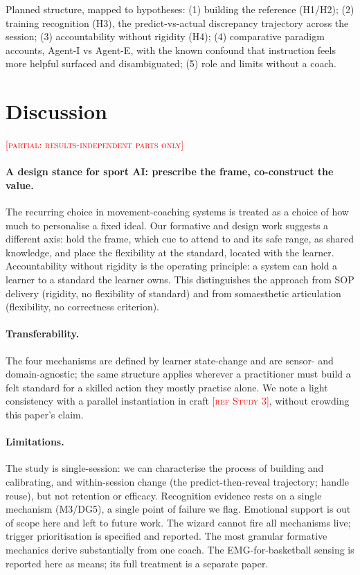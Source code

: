 \documentclass[sigconf]{acmart}
\newcommand{\vf}[1]{\textcolor{red}{[\textsc{#1}]}}
\begin{document}
Planned structure, mapped to hypotheses: (1) building the reference (H1/H2); (2) training recognition (H3), the predict-vs-actual discrepancy trajectory across the session; (3) accountability without rigidity (H4); (4) comparative paradigm accounts, Agent-I vs Agent-E, with the known confound that instruction feels more helpful surfaced and disambiguated; (5) role and limits without a coach.

\section{Discussion}
\vf{partial: results-independent parts only}

\paragraph{A design stance for sport AI: prescribe the frame, co-construct the value.} The recurring choice in movement-coaching systems is treated as a choice of how much to personalise a fixed ideal. Our formative and design work suggests a different axis: hold the frame, which cue to attend to and its safe range, as shared knowledge, and place the flexibility at the standard, located with the learner. Accountability without rigidity is the operating principle: a system can hold a learner to a standard the learner owns. This distinguishes the approach from SOP delivery (rigidity, no flexibility of standard) and from somaesthetic articulation (flexibility, no correctness criterion).

\paragraph{Transferability.} The four mechanisms are defined by learner state-change and are sensor- and domain-agnostic; the same structure applies wherever a practitioner must build a felt standard for a skilled action they mostly practise alone. We note a light consistency with a parallel instantiation in craft \vf{ref Study 3}, without crowding this paper's claim.

\paragraph{Limitations.} The study is single-session: we can characterise the process of building and calibrating, and within-session change (the predict-then-reveal trajectory; handle reuse), but not retention or efficacy. Recognition evidence rests on a single mechanism (M3/DG5), a single point of failure we flag. Emotional support is out of scope here and left to future work. The wizard cannot fire all mechanisms live; trigger prioritisation is specified and reported. The most granular formative mechanics derive substantially from one coach. The EMG-for-basketball sensing is reported here as means; its full treatment is a separate paper.
\end{document}
